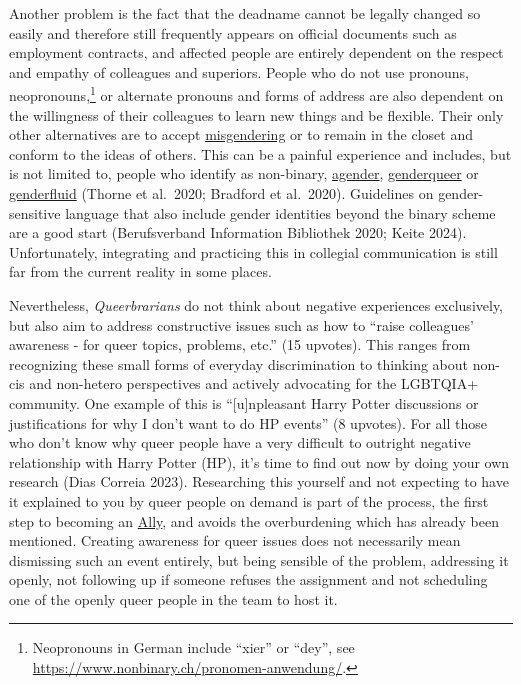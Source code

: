 \documentclass[a4paper,
fontsize=11pt,
oneside,
numbers=noperiodatend,
parskip=half-,
bibliography=totoc,
final
]{scrartcl}
\begin{document}
Another problem is the fact that the deadname cannot be legally changed
so easily and therefore still frequently appears on official documents
such as employment contracts, and affected people are entirely dependent
on the respect and empathy of colleagues and superiors. People who do
not use pronouns, neopronouns,\footnote{Neopronouns in German include
  \enquote{xier} or \enquote{dey}, see
  \url{https://www.nonbinary.ch/pronomen-anwendung/}.} or alternate
pronouns and forms of address are also dependent on the willingness of
their colleagues to learn new things and be flexible. Their only other
alternatives are to accept
\href{https://lgbtqia.fandom.com/wiki/Misgendering}{misgendering} or to
remain in the closet and conform to the ideas of others. This can be a
painful experience and includes, but is not limited to, people who
identify as non-binary,
\href{https://lgbtqia.fandom.com/wiki/Agender}{agender},
\href{https://lgbtqia.fandom.com/wiki/Genderqueer}{genderqueer} or
\href{https://lgbtqia.fandom.com/wiki/Genderfluid}{genderfluid} (Thorne
et al.~2020; Bradford et al.~2020). Guidelines on gender-sensitive
language that also include gender identities beyond the binary scheme
are a good start (Berufsverband Information Bibliothek 2020; Keite
2024). Unfortunately, integrating and practicing this in collegial
communication is still far from the current reality in some places.

Nevertheless, \emph{Queerbrarians} do not think about negative
experiences exclusively, but also aim to address constructive issues
such as how to \enquote{raise colleagues' awareness - for queer topics,
problems, etc.} (15 upvotes). This ranges from recognizing these small
forms of everyday discrimination to thinking about non-cis and
non-hetero perspectives and actively advocating for the LGBTQIA+
community. One example of this is \enquote{{[}u{]}npleasant Harry Potter
discussions or justifications for why I don't want to do
HP events} (8 upvotes). For all those who don't know why
queer people have a very difficult to outright negative relationship
with Harry Potter (HP), it's time to find out now by
doing your own research (Dias Correia 2023). Researching this yourself
and not expecting to have it explained to you by queer people on demand
is part of the process, the first step to becoming an
\href{https://lgbtqia.mywikis.wiki/wiki/Ally}{Ally}, and avoids the
overburdening which has already been mentioned. Creating awareness for
queer issues does not necessarily mean dismissing such an event
entirely, but being sensible of the problem, addressing it openly, not
following up if someone refuses the assignment and not scheduling one of
the openly queer people in the team to host it.
\end{document}
